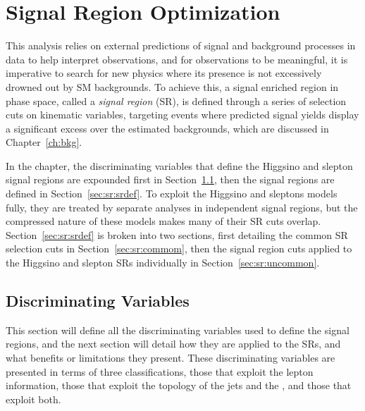 \chapter{Signal Region Optimization}
 \label{ch:sr}
This analysis relies on external predictions of signal and background processes in data to help interpret observations, and for observations to be meaningful, it is imperative to search for new physics where its presence is not excessively drowned out by SM backgrounds.  To achieve this, a signal enriched region in phase space, called a \textit{signal region} (SR), is defined through a series of selection cuts on kinematic variables, targeting events where predicted signal yields display a significant excess over the estimated backgrounds, which are discussed in Chapter~\ref{ch:bkg}.   
 
In the chapter, the discriminating variables that define the Higgsino and slepton signal regions are expounded first in Section~\ref{sec:sr:discvar}, then the signal regions are defined in Section~\ref{sec:sr:srdef}.  To exploit the Higgsino and sleptons models fully, they are treated by separate analyses in independent signal regions, but the compressed nature of these models makes many of their SR cuts overlap.  Section~\ref{sec:sr:srdef} is broken into two sections, first detailing the common SR selection cuts in Section~\ref{sec:sr:commom}, then the signal region cuts applied to the Higgsino and slepton SRs individually in Section~\ref{sec:sr:uncommon}. 
 
\section{Discriminating Variables}
\label{sec:sr:discvar}
This section will define all the discriminating variables used to define the signal regions, and the next section will detail how they are applied to the SRs, and what benefits or limitations they present.  These discriminating variables are presented in terms of three classifications, those that exploit the lepton information, those that exploit the topology of the jets and the \met{}, and those that exploit both.  

